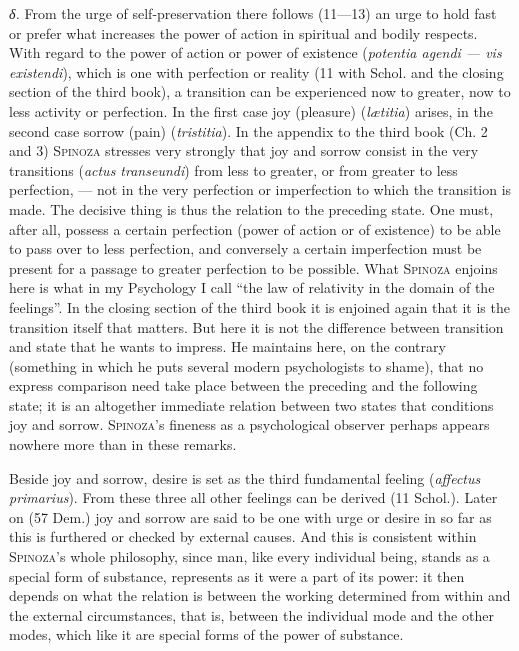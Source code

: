\documentclass[12pt]{article}
\newcommand{\opage}[1]{\marginnote{\footnotesize\textit{[#1]}}}
\begin{document}
\textit{δ.} From the urge of self-preservation there follows (11---13) an urge to hold fast or
prefer what increases the power of action in spiritual and bodily respects. With regard to the
power of action or power of existence (\textit{potentia agendi --- vis existendi}), which is one
with perfection or reality (11 with Schol. and the closing section of the third book), a
transition can be experienced now to greater, now to less activity or perfection. In the first
case joy (pleasure) (\textit{lætitia}) arises, in the second case sorrow (pain) %
(\textit{tristitia}). In the appendix to the third book (Ch. 2 and 3) \textsc{Spinoza} stresses
very strongly that joy and sorrow consist in the very transitions (\textit{actus transeundi}) from
less to greater, or from greater to less perfection, --- not in the very perfection or
imperfection to which the transition is made. The decisive thing is thus the relation to the
preceding state. One must, after all, possess a certain perfection (power of action or of
existence) to be able to pass over to less perfection, and conversely a certain imperfection must
be present for a passage to greater perfection to be possible. What \textsc{Spinoza} enjoins here
is what in my Psychology I call ``the law of relativity in the domain of the feelings''. In the
closing section of the third book it is enjoined again that it is the transition itself that
\opage{64}matters. But here it is not the difference between transition and state that he wants to
impress. He maintains here, on the contrary (something in which he puts several modern
psychologists to shame), that no express comparison need take place between the preceding and the
following state; it is an altogether immediate relation between two states that conditions joy
and sorrow. \textsc{Spinoza}'s fineness as a psychological observer perhaps appears nowhere more
than in these remarks.

Beside joy and sorrow, desire is set as the third fundamental feeling (\textit{affectus
primarius}). From these three all other feelings can be derived (11 Schol.). Later on (57 Dem.)
joy and sorrow are said to be one with urge or desire in so far as this is furthered or checked by
external causes. And this is consistent within \textsc{Spinoza}'s whole philosophy, since man,
like every individual being, stands as a special form of substance, represents as it were a part
of its power: it then depends on what the relation is between the working determined from within
and the external circumstances, that is, between the individual mode and the other modes, which
like it are special forms of the power of substance.
\end{document}
